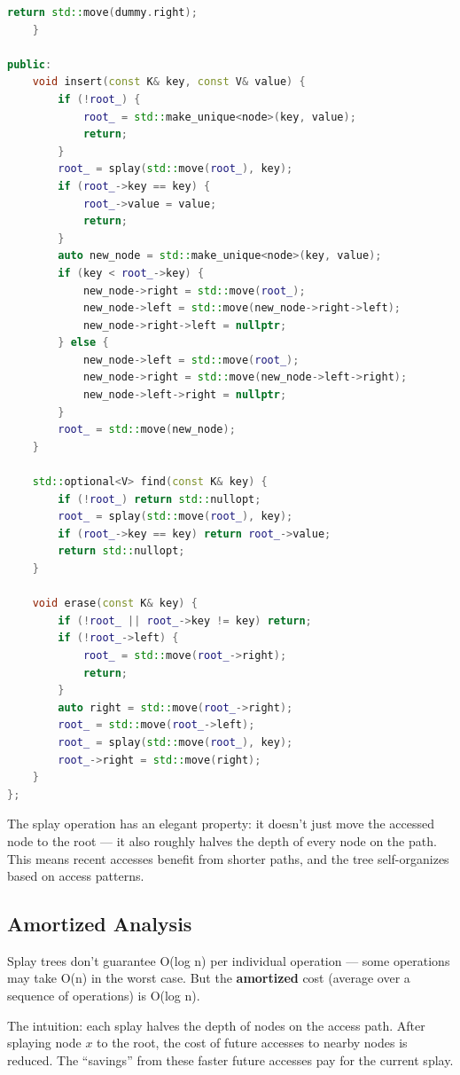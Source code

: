 \begin{lstlisting}[language=C++]
        return std::move(dummy.right);
    }

public:
    void insert(const K& key, const V& value) {
        if (!root_) {
            root_ = std::make_unique<node>(key, value);
            return;
        }
        root_ = splay(std::move(root_), key);
        if (root_->key == key) {
            root_->value = value;
            return;
        }
        auto new_node = std::make_unique<node>(key, value);
        if (key < root_->key) {
            new_node->right = std::move(root_);
            new_node->left = std::move(new_node->right->left);
            new_node->right->left = nullptr;
        } else {
            new_node->left = std::move(root_);
            new_node->right = std::move(new_node->left->right);
            new_node->left->right = nullptr;
        }
        root_ = std::move(new_node);
    }

    std::optional<V> find(const K& key) {
        if (!root_) return std::nullopt;
        root_ = splay(std::move(root_), key);
        if (root_->key == key) return root_->value;
        return std::nullopt;
    }

    void erase(const K& key) {
        if (!root_ || root_->key != key) return;
        if (!root_->left) {
            root_ = std::move(root_->right);
            return;
        }
        auto right = std::move(root_->right);
        root_ = std::move(root_->left);
        root_ = splay(std::move(root_), key);
        root_->right = std::move(right);
    }
};
\end{lstlisting}

The splay operation has an elegant property: it doesn't just move the accessed node to the root — it also roughly halves the depth of every node on the path. This means recent accesses benefit from shorter paths, and the tree self-organizes based on access patterns.

\subsection{Amortized Analysis}

Splay trees don't guarantee O(log n) per individual operation — some operations may take O(n) in the worst case. But the \textbf{amortized} cost (average over a sequence of operations) is O(log n).

The intuition: each splay halves the depth of nodes on the access path. After splaying node $x$ to the root, the cost of future accesses to nearby nodes is reduced. The ``savings'' from these faster future accesses pay for the current splay.


